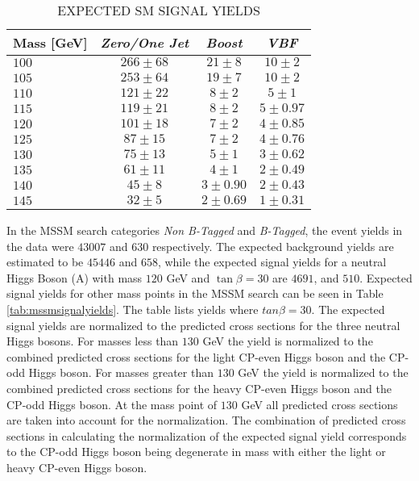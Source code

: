 \begin{table}[htpb]
  \begin{center}
    \caption{EXPECTED SM SIGNAL YIELDS}
    \label{tab:smsignalyields}
    \begin{tabular}{lccc}
    \toprule
    Mass [GeV]	&	\emph{Zero/One Jet}	&	\emph{Boost}	&	\emph{VBF}  	\\	
    \midrule
    $100$     	&	$266 \pm 68$       	&	$21 \pm 8$  	&	$10 \pm 2$  	\\	
    $105$     	&	$253 \pm 64$       	&	$19 \pm 7$  	&	$10 \pm 2$  	\\	
    $110$     	&	$121 \pm 22$       	&	$8 \pm 2$   	&	$5 \pm 1$   	\\	
    $115$     	&	$119 \pm 21$       	&	$8 \pm 2$   	&	$5 \pm 0.97$	\\	
    $120$     	&	$101 \pm 18$       	&	$7 \pm 2$   	&	$4 \pm 0.85$	\\	
    $125$     	&	$87 \pm 15$        	&	$7 \pm 2$   	&	$4 \pm 0.76$	\\	
    $130$     	&	$75 \pm 13$        	&	$5 \pm 1$   	&	$3 \pm 0.62$	\\	
    $135$     	&	$61 \pm 11$        	&	$4 \pm 1$   	&	$2 \pm 0.49$	\\	
    $140$     	&	$45 \pm 8$         	&	$3 \pm 0.90$	&	$2 \pm 0.43$	\\	
    $145$     	&	$32 \pm 5$         	&	$2 \pm 0.69$	&	$1 \pm 0.31$	\\	
      \bottomrule
    \end{tabular}
  \end{center}
\end{table}

In the MSSM search categories \emph{Non B-Tagged} and \emph{B-Tagged}, the event yields in the data were $43007$ and $630$ respectively.
The expected background yields are estimated to be $45446$ and $658$, while the expected signal yields for a neutral Higgs Boson (A) with mass $120$ GeV and $\tan\beta = 30$ are $4691$, and $510$.
Expected signal yields for other mass points in the MSSM search can be seen in Table \ref{tab:mssmsignalyields}. 
The table lists yields where $tan\beta = 30$.
The expected signal yields are normalized to the predicted cross sections for the three neutral Higgs bosons.
For masses less than $130$ GeV the yield is normalized to the combined predicted cross sections for the light CP-even Higgs boson and the CP-odd Higgs boson.
For masses greater than $130$ GeV the yield is normalized to the combined predicted cross sections for the heavy CP-even Higgs boson and the CP-odd Higgs boson.
At the mass point of $130$ GeV all predicted cross sections are taken into account for the normalization.
The combination of predicted cross sections in calculating the normalization of the expected signal yield corresponds to the CP-odd Higgs boson being degenerate in mass with either the light or heavy CP-even Higgs boson.

